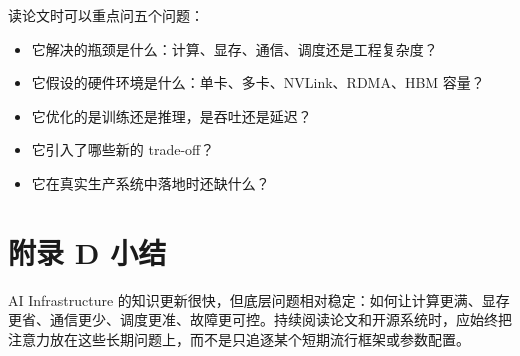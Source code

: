 读论文时可以重点问五个问题：

\begin{itemize}
\item 它解决的瓶颈是什么：计算、显存、通信、调度还是工程复杂度？
\item 它假设的硬件环境是什么：单卡、多卡、NVLink、RDMA、HBM 容量？
\item 它优化的是训练还是推理，是吞吐还是延迟？
\item 它引入了哪些新的 trade-off？
\item 它在真实生产系统中落地时还缺什么？
\end{itemize}

\section{附录 D 小结}

AI Infrastructure 的知识更新很快，但底层问题相对稳定：如何让计算更满、显存更省、通信更少、调度更准、故障更可控。持续阅读论文和开源系统时，应始终把注意力放在这些长期问题上，而不是只追逐某个短期流行框架或参数配置。
